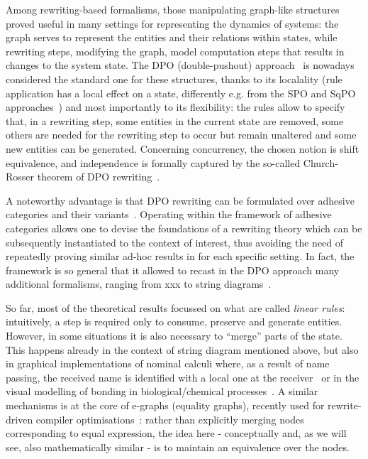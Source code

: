 \documentclass[a4paper,UKenglish,cleveref,pdftex, thm-restate,numberwithinsect]{lipics}
\begin{document}
Among rewriting-based formalisms, those manipulating graph-like structures
proved useful in many settings for representing the dynamics of systems: the 
graph serves to represent the entities and their relations within states, while 
rewriting steps, modifying the graph, model computation steps that results 
in changes to the system state. The DPO (double-pushout) approach~\cite{xxx} is
nowadays considered the standard one for these structures, thanks to its localality 
(rule application has a local effect on a state, differently e.g. from the SPO and SqPO 
approaches~\cite{xxx,xxx}) and most importantly to its flexibility: the rules allow to 
specify that,  in a rewriting step, some entities in the current state are removed, 
some others are needed for the rewriting step to occur but remain unaltered and 
some new entities can be generated. Concerning concurrency, the chosen notion 
is shift equivalence, and independence is formally captured by the so-called 
Church-Rosser theorem of DPO rewriting~\cite{CMREHL:AAGT}.

A noteworthy advantage is that DPO rewriting can be formulated over
adhesive categories and their variants~\cite{lack2005adhesive,ehrig2006weak}. 
%
Operating within the framework of adhesive categories allows one to devise 
the foundations of a rewriting theory which can be subsequently instantiated 
to the context of interest, thus avoiding the need of repeatedly proving
similar ad-hoc results in for each specific setting. In fact, the framework is
so general that it allowed to recast in the DPO approach many additional formalisms,
ranging from xxx to string diagrams~\cite{bonchi2022string}.

So far, most of the theoretical results focussed on what are called \emph{linear rules}: 
intuitively, a step is required only to consume, preserve and generate entities. 
However, in some situations it is also necessary to ``merge'' parts of the state. 
This happens already in the context of string diagram mentioned above, but also 
in graphical implementations of nominal calculi where, as a result of name passing, 
the received name is identified with a local one at the
receiver~\cite{CVY:ESSPE,Gad07} or in the visual modelling of bonding in
biological/chemical processes~\cite{PUY:MBPE}. A similar mechanisms is
at the core of e-graphs (equality graphs), recently used for
rewrite-driven compiler optimisations~\cite{WNW:egg}: rather than
explicitly merging nodes corresponding to equal expression, the idea
here - conceptually and, as we will see, also mathematically similar -
is to maintain an equivalence
over the nodes.  
\end{document}

